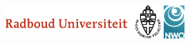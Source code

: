 \begin{titlepage}

    \begin{center}

        \vspace*{2\bigskipamount}

        {\makeatletter
            \titlestyle\bfseries\LARGE\@title
            \makeatother}

        {\makeatletter
            \ifx\@subtitle\undefined\else
                \bigskip
                \titlefont\titleshape\Large\@subtitle
            \fi
            \makeatother}

    \end{center}

    \clearpage
    \thispagestyle{empty}


    
    \bigskip
    \bigskip

    \begin{center}
        \includegraphics[height=0.5in]{_logos/Logo_RU_NL_RGB.pdf}
        \hspace{2em}
        \includegraphics[height=0.5in]{_logos/NWO.jpg}
    \end{center}
    \vfill
    \noindent


\end{titlepage}
